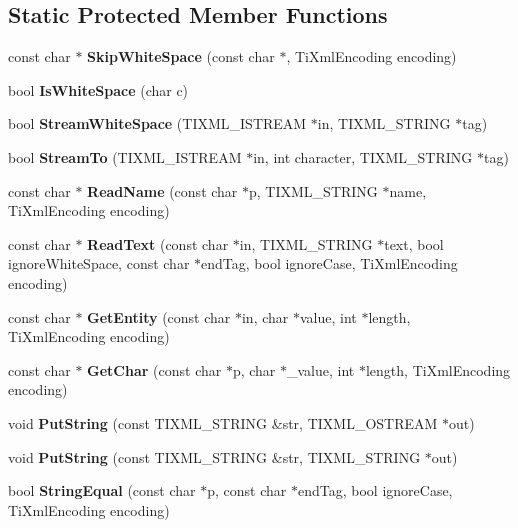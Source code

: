 \subsection*{Static Protected Member Functions}
\begin{CompactItemize}
\item 
const char $\ast$ {\bf Skip\-White\-Space} (const char $\ast$, Ti\-Xml\-Encoding encoding)\label{classTiXmlBase_TiXmlUnknownf0}

\item 
bool {\bf Is\-White\-Space} (char c)\label{classTiXmlBase_TiXmlUnknownf1}

\item 
bool {\bf Stream\-White\-Space} (TIXML\_\-ISTREAM $\ast$in, TIXML\_\-STRING $\ast$tag)\label{classTiXmlBase_TiXmlUnknownf2}

\item 
bool {\bf Stream\-To} (TIXML\_\-ISTREAM $\ast$in, int character, TIXML\_\-STRING $\ast$tag)\label{classTiXmlBase_TiXmlUnknownf3}

\item 
const char $\ast$ {\bf Read\-Name} (const char $\ast$p, TIXML\_\-STRING $\ast$name, Ti\-Xml\-Encoding encoding)\label{classTiXmlBase_TiXmlUnknownf4}

\item 
const char $\ast$ {\bf Read\-Text} (const char $\ast$in, TIXML\_\-STRING $\ast$text, bool ignore\-White\-Space, const char $\ast$end\-Tag, bool ignore\-Case, Ti\-Xml\-Encoding encoding)\label{classTiXmlBase_TiXmlUnknownf5}

\item 
const char $\ast$ {\bf Get\-Entity} (const char $\ast$in, char $\ast$value, int $\ast$length, Ti\-Xml\-Encoding encoding)\label{classTiXmlBase_TiXmlUnknownf6}

\item 
const char $\ast$ {\bf Get\-Char} (const char $\ast$p, char $\ast$\_\-value, int $\ast$length, Ti\-Xml\-Encoding encoding)\label{classTiXmlBase_TiXmlUnknownf7}

\item 
void {\bf Put\-String} (const TIXML\_\-STRING \&str, TIXML\_\-OSTREAM $\ast$out)\label{classTiXmlBase_TiXmlUnknownf8}

\item 
void {\bf Put\-String} (const TIXML\_\-STRING \&str, TIXML\_\-STRING $\ast$out)\label{classTiXmlBase_TiXmlUnknownf9}

\item 
bool {\bf String\-Equal} (const char $\ast$p, const char $\ast$end\-Tag, bool ignore\-Case, Ti\-Xml\-Encoding encoding)\label{classTiXmlBase_TiXmlUnknownf10}


\end{CompactItemize}
